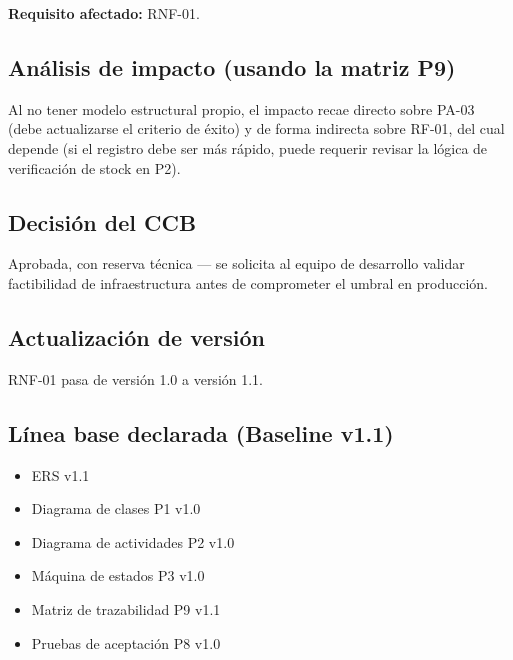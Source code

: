 \documentclass[11pt]{article}
\begin{document}
\noindent \textbf{Requisito afectado:} RNF-01.

\subsection*{Análisis de impacto (usando la matriz P9)}
Al no tener modelo estructural propio, el impacto recae directo sobre PA-03 (debe actualizarse el criterio de éxito) y de forma indirecta sobre RF-01, del cual depende (si el registro debe ser más rápido, puede requerir revisar la lógica de verificación de stock en P2).

\subsection*{Decisión del CCB}
Aprobada, con reserva técnica --- se solicita al equipo de desarrollo validar factibilidad de infraestructura antes de comprometer el umbral en producción.

\subsection*{Actualización de versión}
RNF-01 pasa de versión 1.0 a versión 1.1.

\subsection*{Línea base declarada (Baseline v1.1)}
\begin{itemize}
\item ERS v1.1
\item Diagrama de clases P1 v1.0
\item Diagrama de actividades P2 v1.0
\item Máquina de estados P3 v1.0
\item Matriz de trazabilidad P9 v1.1
\item Pruebas de aceptación P8 v1.0
\end{itemize}
\end{document}
